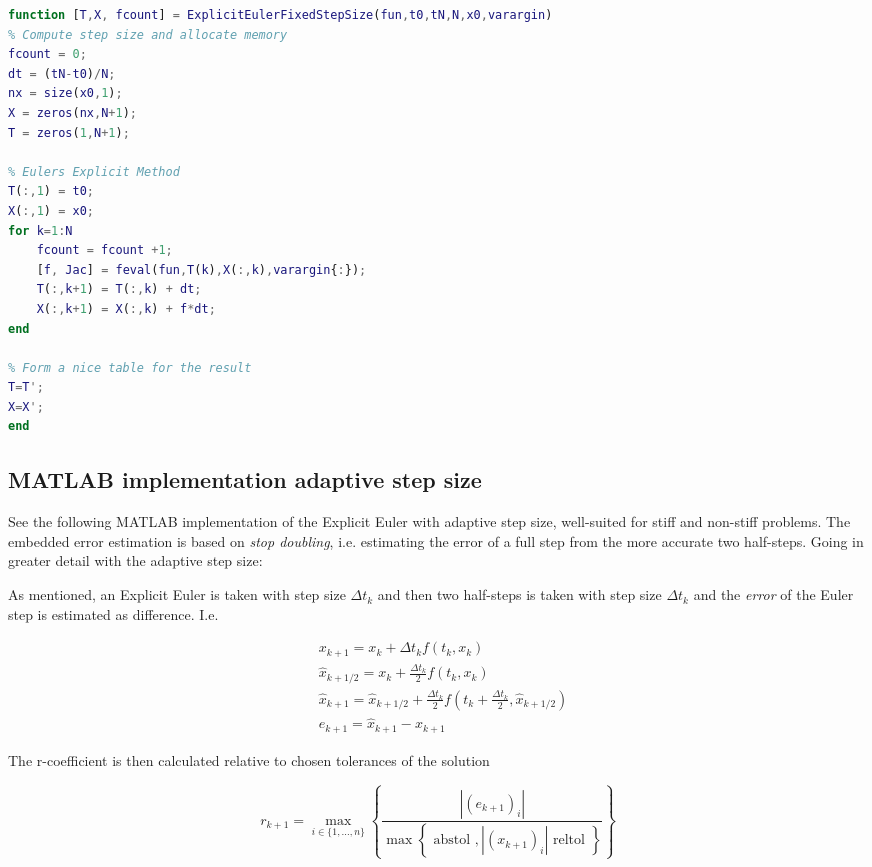 \begin{adjustwidth*}{0cm}{-0.4cm}
\begin{lstlisting}[frame=single, language=Matlab,caption=Explicit Euler (fixed step size), label=ExplicitEulerFixie]
function [T,X, fcount] = ExplicitEulerFixedStepSize(fun,t0,tN,N,x0,varargin)
% Compute step size and allocate memory
fcount = 0;
dt = (tN-t0)/N;
nx = size(x0,1);
X = zeros(nx,N+1);
T = zeros(1,N+1);

% Eulers Explicit Method
T(:,1) = t0;
X(:,1) = x0;
for k=1:N
    fcount = fcount +1;
    [f, Jac] = feval(fun,T(k),X(:,k),varargin{:});
    T(:,k+1) = T(:,k) + dt;
    X(:,k+1) = X(:,k) + f*dt;
end

% Form a nice table for the result
T=T';
X=X';
end
\end{lstlisting}
\end{adjustwidth*}

\subsection{MATLAB implementation adaptive step size}
\label{sec:ExplicitEulerAdaptive} \label{sec:stepdoubling}
See the following MATLAB implementation of the Explicit Euler with adaptive step size, well-suited for stiff and non-stiff problems. The embedded error estimation is based on \textit{stop doubling}, i.e. estimating the error of a full step from the more accurate two half-steps. Going in greater detail with the adaptive step size:

As mentioned, an Explicit Euler is taken with step size $\Delta {t_k}$ and then two half-steps is taken with step size $\Delta t_k$ and the \textit{error} of the Euler step is estimated as difference. I.e. 

\begin{equation}
\begin{aligned}
&x_{k+1}=x_{k}+\Delta t_k f\left(t_{k}, x_{k}\right) \\
&\hat{x}_{k+1 / 2}=x_{k}+\frac{\Delta t_k}{2} f\left(t_{k}, x_{k}\right) \\
&\hat{x}_{k+1}=\hat{x}_{k+1 / 2}+\frac{\Delta t_k}{2} f\left(t_{k}+\frac{\Delta t_k}{2}, \hat{x}_{k+1 / 2}\right) \\
&e_{k+1}=\hat{x}_{k+1}-x_{k+1}
\end{aligned}
\end{equation}

The r-coefficient is then calculated relative to chosen tolerances of the solution

\begin{equation}
r_{k+1}=\max _{i \in\{1, \ldots, n\}}\left\{\frac{\left|\left(e_{k+1}\right)_{i}\right|}{\max \left\{\text { abstol },\left|\left(x_{k+1}\right)_{i}\right| \text { reltol }\right\}}\right\}
\end{equation}

